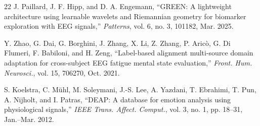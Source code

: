 \documentclass[journal,twoside,web]{ieeecolor2}
\begin{document}
\begin{thebibliography}{22}
J. Paillard, J. F. Hipp, and D. A. Engemann, ``GREEN: A
lightweight architecture using learnable wavelets and Riemannian
geometry for biomarker exploration with EEG signals,''
\emph{Patterns}, vol. 6, no. 3, 101182, Mar. 2025.

Y. Zhao, G. Dai, G. Borghini, J. Zhang, X. Li, Z. Zhang,
P. Aric\`{o}, G. Di Flumeri, F. Babiloni, and H. Zeng,
``Label-based alignment multi-source domain adaptation for
cross-subject EEG fatigue mental state evaluation,''
\emph{Front. Hum. Neurosci.}, vol. 15, 706270, Oct. 2021.

S. Koelstra, C. M\"{u}hl, M. Soleymani, J.-S. Lee, A. Yazdani,
T. Ebrahimi, T. Pun, A. Nijholt, and I. Patras, ``DEAP: A
database for emotion analysis using physiological signals,''
\emph{IEEE Trans. Affect. Comput.}, vol. 3, no. 1, pp. 18--31,
Jan.--Mar. 2012.

\end{thebibliography}



\end{document}
